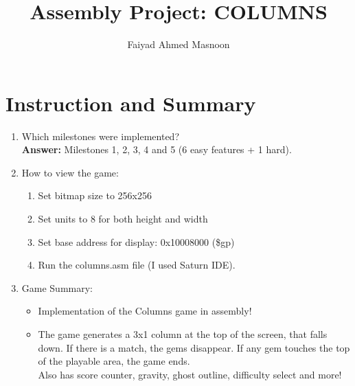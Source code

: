 \documentclass{article}
\title{Assembly Project: COLUMNS}
\author{Faiyad Ahmed Masnoon}
\begin{document}
\maketitle

\section{Instruction and Summary}

\begin{enumerate}

    \item Which milestones were implemented? \\
    \textbf{Answer: } Milestones 1, 2, 3, 4 and 5 (6 easy features + 1 hard). 

    \item How to view the game:
    
    \begin{enumerate}

    \item Set bitmap size to 256x256
    \item Set units to 8 for both height and width
    \item Set base address for display: 0x10008000 (\$gp)
    \item Run the columns.asm file (I used Saturn IDE).

    \end{enumerate}

\item Game Summary:
\begin{itemize}
\item Implementation of the Columns game in assembly!
\item The game generates a 3x1 column at the top of the screen, that falls down. If there is a match, the gems disappear. If any gem touches the top of the playable area, the game ends.\\Also has score counter, gravity, ghost outline, difficulty select and more!
\end{itemize}

    
\end{enumerate}
\end{document}
